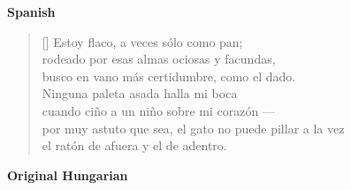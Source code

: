 \documentclass[a4paper,12pt,twoside,final]{book}
\begin{document}
\noindent \textbf{Spanish}


\settowidth{\versewidth}{por muy astuto que sea, el gato no puede pillar a la vez}

\begin{verse}[\versewidth]
  Estoy flaco, a veces sólo como pan; \\
  rodeado por esas almas ociosas y facundas, \\
  busco en vano más certidumbre, como el dado. \\
  Ninguna paleta asada halla mi boca \\
  cuando ciño a un niño sobre mi corazón --- \\
  por muy astuto que sea, el gato no puede pillar a la vez \\
  el ratón de afuera y el de adentro. \\
\end{verse}

\newpage


\noindent \textbf{Original Hungarian}


\settowidth{\versewidth}{számhoz s szivemhez kisgyerek ---}
\end{document}
